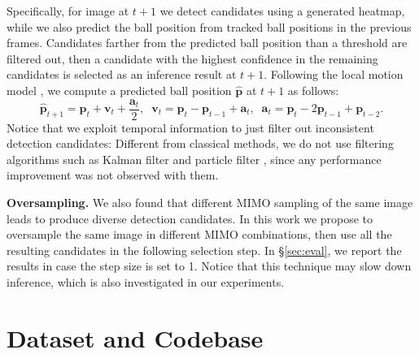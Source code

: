 \documentclass{bmvc2k}
\begin{document}
Specifically, for image at $t+1$ we detect candidates using a generated heatmap, while we also predict the ball position from tracked ball positions in the previous frames.
Candidates farther from the predicted ball position than a threshold are filtered out, then a candidate with the highest confidence in the remaining candidates is selected as an inference result at $t+1$.
Following the local motion model \cite{zhou+2013icassp,zhou+2015tmm}, we compute a predicted ball position $\hat{\mathbf{p}}$ at $t+1$ as follows:
\begin{equation}
\hat{\mathbf{p}}_{t+1} = \mathbf{p}_{t} + \mathbf{v}_{t} + \frac{\mathbf{a}_{t}}{2}, \;\; \mathbf{v}_{t} = \mathbf{p}_{t} - \mathbf{p}_{t-1} + \mathbf{a}_{t}, \;\; \mathbf{a}_{t} = \mathbf{p}_{t} - 2 \mathbf{p}_{t-1} + \mathbf{p}_{t-2}.
\label{eq:pred}
\end{equation}
Notice that we exploit temporal information to just filter out inconsistent detection candidates:
Different from classical methods, we do not use filtering algorithms such as Kalman filter \cite{yu+2003icme,yu+2003icme2,yu+2003acmmm,yu+2004icip,zaveri+2004icme,kittler+2005ia,liang+2005pcm,chen+2006cesa,ren+2006eccvw,yu+2006tmm,yu+2007icme,yu+2007vcip,kim+2009cgiv,chakraborty+2013indicon} and particle filter \cite{yan+2005bmvc,abed+2006acivs,ariki+2008icme,huang+2008icpr,zhu+2008civr,beetz+2009ijcss,zhu+2009tmm}, since any performance improvement was not observed with them.
\par
\vspace{1mm}
\noindent \textbf{Oversampling.}
We also found that different MIMO sampling of the same image leads to produce diverse detection candidates.
In this work we propose to oversample the same image in different MIMO combinations, then use all the resulting candidates in the following selection step.
In \S \ref{sec:eval}, we report the results in case the step size is set to 1.
Notice that this technique may slow down inference, which is also investigated in our experiments.
\section{Dataset and Codebase}
\label{sec:dataset}
\end{document}
